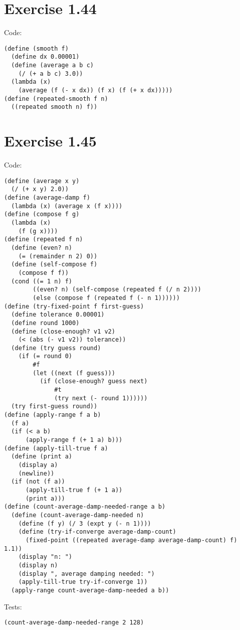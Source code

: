 \documentclass[../main.tex]{subfiles}
\begin{document}
\section{Exercise 1.44}

Code:

\begin{lstlisting}
(define (smooth f)
  (define dx 0.00001)
  (define (average a b c)
    (/ (+ a b c) 3.0))
  (lambda (x)
    (average (f (- x dx)) (f x) (f (+ x dx)))))
(define (repeated-smooth f n)
  ((repeated smooth n) f))
\end{lstlisting}

\section{Exercise 1.45}

Code:

\begin{lstlisting}
(define (average x y)
  (/ (+ x y) 2.0))
(define (average-damp f)
  (lambda (x) (average x (f x))))
(define (compose f g)
  (lambda (x)
    (f (g x))))
(define (repeated f n)
  (define (even? n)
    (= (remainder n 2) 0))
  (define (self-compose f)
    (compose f f))
  (cond ((= 1 n) f)
        ((even? n) (self-compose (repeated f (/ n 2))))
        (else (compose f (repeated f (- n 1))))))
(define (try-fixed-point f first-guess)
  (define tolerance 0.00001)
  (define round 1000)
  (define (close-enough? v1 v2)
    (< (abs (- v1 v2)) tolerance))
  (define (try guess round)
    (if (= round 0)
        #f
        (let ((next (f guess)))
          (if (close-enough? guess next)
              #t
              (try next (- round 1))))))
  (try first-guess round))
(define (apply-range f a b)
  (f a)
  (if (< a b)
      (apply-range f (+ 1 a) b)))
(define (apply-till-true f a)
  (define (print a)
    (display a)
    (newline))
  (if (not (f a))
      (apply-till-true f (+ 1 a))
      (print a)))
(define (count-average-damp-needed-range a b)
  (define (count-average-damp-needed n)
    (define (f y) (/ 3 (expt y (- n 1))))
    (define (try-if-converge average-damp-count)
      (fixed-point ((repeated average-damp average-damp-count) f) 1.1))
    (display "n: ")
    (display n)
    (display ", average damping needed: ")
    (apply-till-true try-if-converge 1))
  (apply-range count-average-damp-needed a b))
\end{lstlisting}

Tests:

\begin{lstlisting}
(count-average-damp-needed-range 2 128)
\end{lstlisting}
\end{document}
